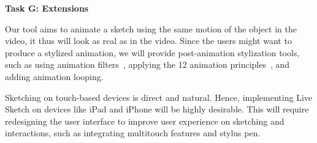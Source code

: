 {	%


\textbf{Task G: Extensions}

Our tool aims to animate a sketch using the same motion of the object in the video, it thus will look as real as in the video. Since the users might want to produce a stylized animation, we will provide post-animation stylization tools, such as using animation filters~\cite{Wang:2006}, applying the 12 animation principles~\cite{Kazi:2016}, and adding animation looping.



Sketching on touch-based devices is direct and natural. Hence,
implementing Live Sketch on devices like iPad and iPhone will be highly desirable.  This will require redesigning the user interface to improve user experience on sketching and interactions, such as integrating multitouch features and stylus pen.

}
